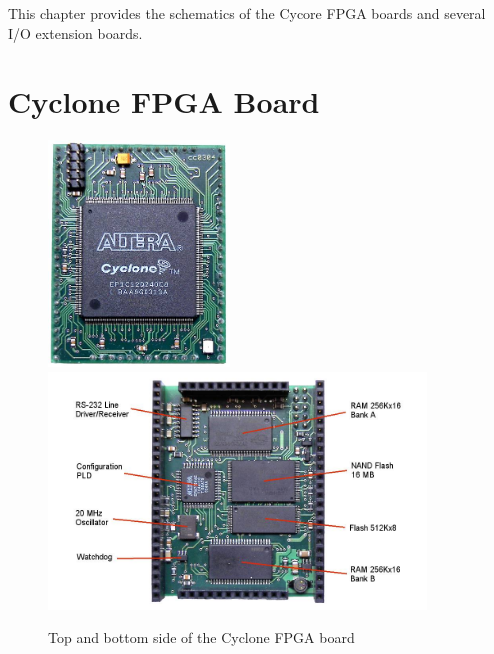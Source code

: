 

This chapter provides the schematics of the Cycore FPGA boards and
several I/O extension boards.

\newpage
\section{Cyclone FPGA Board} \label{appx:cycore}

\begin{figure}[h!]
    \centering
    \includegraphics[height=60mm]{appendix/cycore_top}
    \includegraphics[height=63mm]{appendix/cycore_bottom}
    \caption{Top and bottom side of the Cyclone FPGA board}
\end{figure}


